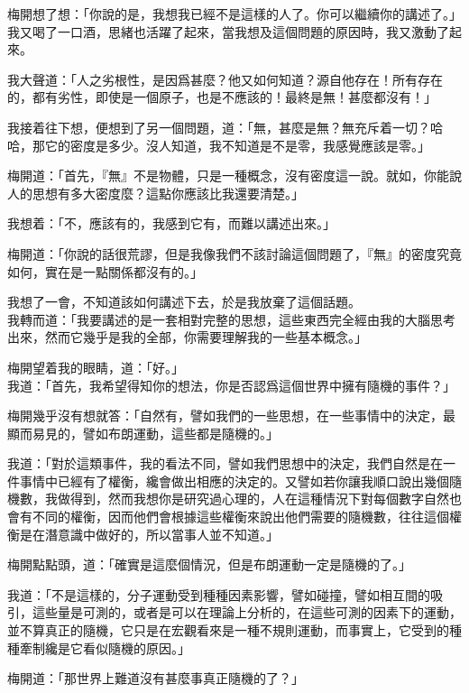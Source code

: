 梅開想了想：「你說的是，我想我已經不是這樣的人了。你可以繼續你的講述了。」
\\


我又喝了一口酒，思緒也活躍了起來，當我想及這個問題的原因時，我又激動了起來。

我大聲道：「人之劣根性，是因爲甚麼？他又如何知道？源自他存在！所有存在的，都有劣性，即使是一個原子，也是不應該的！最終是無！甚麼都沒有！」

我接着往下想，便想到了另一個問題，道：「無，甚麼是無？無充斥着一切？哈哈，那它的密度是多少。沒人知道，我不知道是不是零，我感覺應該是零。」

梅開道：「首先，『無』不是物體，只是一種概念，沒有密度這一說。就如，你能說人的思想有多大密度麼？這點你應該比我還要清楚。」

我想着：「不，應該有的，我感到它有，而難以講述出來。」

梅開道：「你說的話很荒謬，但是我像我們不該討論這個問題了，『無』的密度究竟如何，實在是一點關係都沒有的。」

我想了一會，不知道該如何講述下去，於是我放棄了這個話題。
\\


我轉而道：「我要講述的是一套相對完整的思想，這些東西完全經由我的大腦思考出來，然而它幾乎是我的全部，你需要理解我的一些基本概念。」

梅開望着我的眼睛，道：「好。」
\\


我道：「首先，我希望得知你的想法，你是否認爲這個世界中擁有隨機的事件？」

梅開幾乎沒有想就答：「自然有，譬如我們的一些思想，在一些事情中的決定，最顯而易見的，譬如布朗運動，這些都是隨機的。」

我道：「對於這類事件，我的看法不同，譬如我們思想中的決定，我們自然是在一件事情中已經有了權衡，纔會做出相應的決定的。又譬如若你讓我順口說出幾個隨機數，我做得到，然而我想你是研究過心理的，人在這種情況下對每個數字自然也會有不同的權衡，因而他們會根據這些權衡來說出他們需要的隨機數，往往這個權衡是在潛意識中做好的，所以當事人並不知道。」

梅開點點頭，道：「確實是這麼個情況，但是布朗運動一定是隨機的了。」

我道：「不是這樣的，分子運動受到種種因素影響，譬如碰撞，譬如相互間的吸引，這些量是可測的，或者是可以在理論上分析的，在這些可測的因素下的運動，並不算真正的隨機，它只是在宏觀看來是一種不規則運動，而事實上，它受到的種種牽制纔是它看似隨機的原因。」

梅開道：「那世界上難道沒有甚麼事真正隨機的了？」

